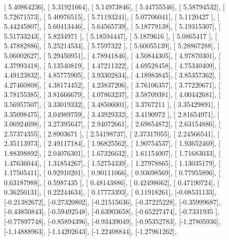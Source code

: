 \documentclass{article}
\begin{document}
       [ 5.40864236],
       [ 5.31921664],
       [ 5.14973846],
       [ 5.44755546],
       [ 5.58794532],
       [ 5.72671573],
       [ 5.40976515],
       [ 5.71193241],
       [ 5.07706041],
       [ 5.1120427 ],
       [ 5.44245807],
       [ 5.60413446],
       [ 5.64565739],
       [ 5.18779138],
       [ 5.19315307],
       [ 5.51733243],
       [ 5.8234971 ],
       [ 5.18594447],
       [ 5.1879616 ],
       [ 5.0865417 ],
       [ 5.47882886],
       [ 5.25214534],
       [ 5.7597322 ],
       [ 5.60055139],
       [ 5.28867288],
       [ 5.06002627],
       [ 5.29450951],
       [ 4.78941846],
       [ 4.50844305],
       [ 4.97870301],
       [ 4.37993418],
       [ 5.13540819],
       [ 4.47211322],
       [ 4.69528458],
       [ 4.75340409],
       [ 4.49123832],
       [ 4.85775905],
       [ 3.93302834],
       [ 4.18983845],
       [ 3.85357362],
       [ 4.27460808],
       [ 4.38174452],
       [ 4.23837206],
       [ 3.76106357],
       [ 3.77220671],
       [ 3.78155385],
       [ 3.81666679],
       [ 4.07863237],
       [ 3.58709381],
       [ 4.00442681],
       [ 3.56957507],
       [ 3.33019332],
       [ 3.48506001],
       [ 3.3767211 ],
       [ 3.35429891],
       [ 3.35098475],
       [ 3.04989759],
       [ 3.43929332],
       [ 3.4190972 ],
       [ 2.81654971],
       [ 3.06924698],
       [ 3.27395647],
       [ 2.94072661],
       [ 2.69854872],
       [ 2.63154886],
       [ 2.57374355],
       [ 2.8903671 ],
       [ 2.54198737],
       [ 2.37317055],
       [ 2.24566541],
       [ 2.35113973],
       [ 2.49117184],
       [ 1.96825562],
       [ 1.90754537],
       [ 1.93652469],
       [ 1.88398892],
       [ 2.04076301],
       [ 1.67326632],
       [ 1.61154007],
       [ 1.71683033],
       [ 1.47636044],
       [ 1.31854267],
       [ 1.52754339],
       [ 1.27978865],
       [ 1.13035179],
       [ 1.17505411],
       [ 0.92910201],
       [ 0.90111066],
       [ 0.93698569],
       [ 0.77955896],
       [ 0.63187988],
       [ 0.5987435 ],
       [ 0.48143886],
       [ 0.42498662],
       [ 0.47190724],
       [ 0.36250131],
       [ 0.22244634],
       [ 0.17773393],
       [ 0.11918261],
       [-0.08531133],
       [-0.21382672],
       [-0.27320802],
       [-0.21515636],
       [-0.37225228],
       [-0.35999687],
       [-0.43850843],
       [-0.59492548],
       [-0.63903658],
       [-0.65227474],
       [-0.7331935 ],
       [-0.77897748],
       [-0.85894396],
       [-0.93439049],
       [-0.95352783],
       [-1.27805936],
       [-1.14888963],
       [-1.14202643],
       [-1.22408844],
       [-1.27961262],
\end{document}
